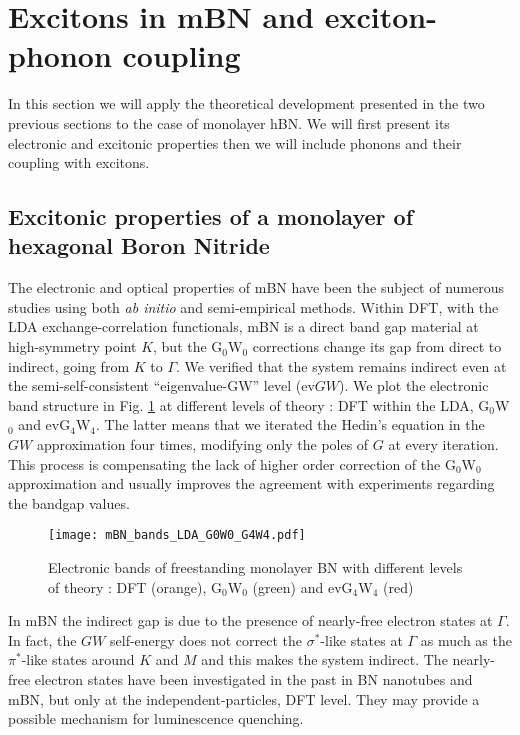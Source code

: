 \section{Excitons in mBN and exciton-phonon coupling}
In this section we will apply the theoretical development presented in the two previous sections to the case of monolayer hBN. We will first present its electronic and excitonic properties then we will include phonons and their coupling with excitons.
%
\subsection{Excitonic properties of a monolayer of hexagonal Boron Nitride}
The electronic and optical properties of \acrfull{mBN} have been the subject of numerous studies using both \emph{ab initio} and semi-empirical methods.\cite{galvani2016excitons}
Within DFT, with the LDA exchange-correlation functionals, \acrshort{mBN} is a direct band gap material at high-symmetry point $K$, but the G$_0$W$_0$ corrections change its gap from direct to indirect, going from $K$ to $\Gamma$.\cite{prete2020giant} 
We verified that the system remains indirect even at the semi-self-consistent ``eigenvalue-GW'' level (ev$GW$). We plot the electronic band structure in Fig. \ref{fig:mBN_bands_LDA_G0W0_G4W4} at different levels of theory : \acrshort{DFT} within the \acrshort{LDA}, G$_0$W$_0$ and evG$_4$W$_4$. The latter means that we iterated the Hedin's equation in the $GW$ approximation four times, modifying only the poles of $G$ at every iteration.\cite{van2006quasiparticle} This process is compensating the lack of higher order correction of the G$_0$W$_0$ approximation and usually improves the agreement with experiments regarding the bandgap values.\cite{faber2014excited}
\begin{figure}[h!tb]
	\vspace{0.2cm}
	\setcapindent{2em}
	\centering
	\texttt{[image: mBN\_bands\_LDA\_G0W0\_G4W4.pdf]}
	\caption{Electronic bands of freestanding monolayer BN with different levels of theory : DFT (orange), G$_ 0$W$_0$ (green) and evG$_4$W$_4$ (red)}
	\label{fig:mBN_bands_LDA_G0W0_G4W4}
\end{figure}
In \acrshort{mBN} the indirect gap is due to the presence of nearly-free electron states at $\Gamma$. 
In fact, the $GW$ self-energy does not correct the $\sigma^*$-like states at $\Gamma$ as much as the $\pi^*$-like states around $K$ and $M$ and this makes the system indirect.
The nearly-free electron states have been investigated in the past in BN nanotubes and mBN,\cite{blase1994stability,Blase1995monolayer} but only at the independent-particles, \acrshort{DFT} level. They may provide a possible mechanism for luminescence quenching.\cite{schue2016dimensionality}

